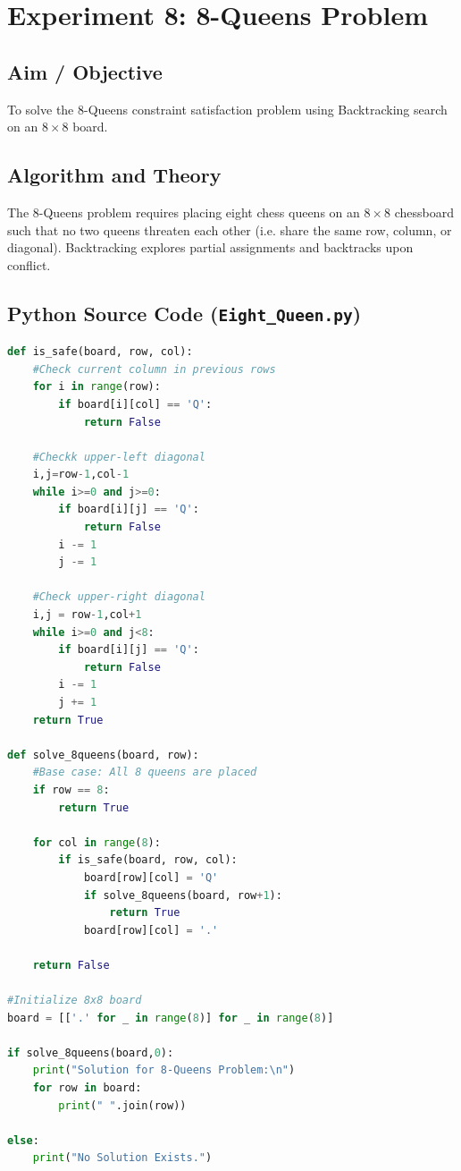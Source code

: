 \documentclass[11pt,a4paper]{report}
\begin{document}
\newpage

\chapter{Experiment 8: 8-Queens Problem}

\section{Aim / Objective}
To solve the 8-Queens constraint satisfaction problem using Backtracking search on an $8 \times 8$ board.

\section{Algorithm and Theory}
The 8-Queens problem requires placing eight chess queens on an $8 \times 8$ chessboard such that no two queens threaten each other (i.e. share the same row, column, or diagonal). Backtracking explores partial assignments and backtracks upon conflict.

\section{Python Source Code (\texttt{Eight_Queen.py})}
\begin{lstlisting}[language=Python]
def is_safe(board, row, col):
    #Check current column in previous rows
    for i in range(row):
        if board[i][col] == 'Q':
            return False
    
    #Checkk upper-left diagonal
    i,j=row-1,col-1
    while i>=0 and j>=0:
        if board[i][j] == 'Q':
            return False
        i -= 1
        j -= 1
        
    #Check upper-right diagonal
    i,j = row-1,col+1
    while i>=0 and j<8:
        if board[i][j] == 'Q':
            return False
        i -= 1
        j += 1
    return True

def solve_8queens(board, row):
    #Base case: All 8 queens are placed
    if row == 8:
        return True
    
    for col in range(8):
        if is_safe(board, row, col):
            board[row][col] = 'Q'
            if solve_8queens(board, row+1):
                return True
            board[row][col] = '.'
            
    return False

#Initialize 8x8 board
board = [['.' for _ in range(8)] for _ in range(8)]

if solve_8queens(board,0):
    print("Solution for 8-Queens Problem:\n")
    for row in board:
        print(" ".join(row))
        
else:
    print("No Solution Exists.")
\end{lstlisting}
\end{document}
